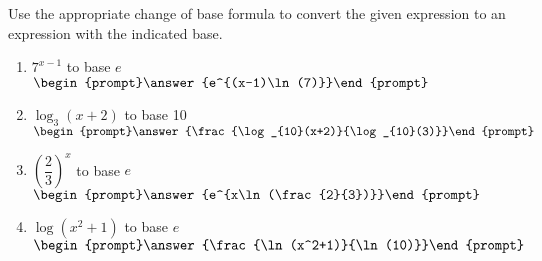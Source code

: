 \documentclass{ximera}
\author{Carl Stitz \and Jeff Zeager \and Bart Snapp \and Matthew Carr}
\begin{document}
\begin{exercise}





Use the appropriate change of base formula to convert the given
expression to an expression with the indicated base.

\begin{multicols}{2}
\begin{enumerate}
\item $7^{x - 1}$ to base $e$\\ $\begin{prompt}\answer{e^{(x-1)\ln(7)}}\end{prompt}$ \label{changeofbasefirst}
\item $\log_{3}(x + 2)$ to base 10\\ $\begin{prompt}\answer{\frac{\log_{10}(x+2)}{\log_{10}(3)}}\end{prompt}$
\item $\left(\dfrac{2}{3}\right)^{x}$ to base $e$\\ $\begin{prompt}\answer{e^{x\ln(\frac{2}{3})}}\end{prompt}$
\item $\log(x^{2} + 1)$ to base $e$ \\ $\begin{prompt}\answer{\frac{\ln(x^2+1)}{\ln(10)}}\end{prompt}$ \label{changeofbaselast}
\end{enumerate}
\end{multicols}

\end{exercise}
\end{document}

